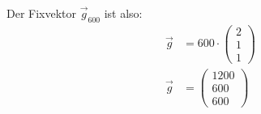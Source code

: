 \begin{flushleft}
Der Fixvektor $\vec{g}_{600}$ ist also:
\begin{align}
    \vec{g}&=600\cdot\begin{pmatrix} 2 \\ 1 \\ 1 \end{pmatrix} \\
    \vec{g}&=\begin{pmatrix} 1200 \\ 600 \\ 600 \end{pmatrix}
\end{align}
\end{flushleft}
